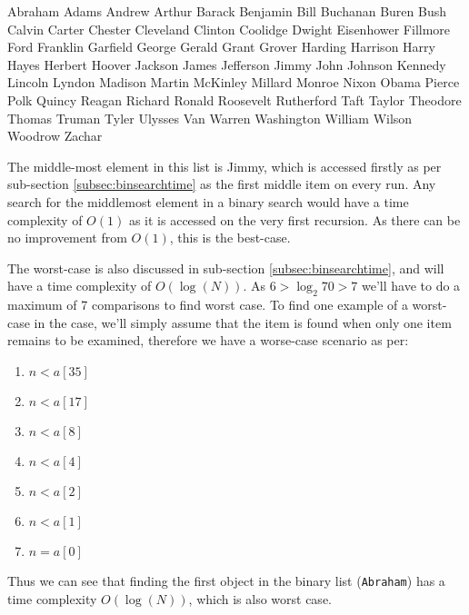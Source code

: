 \documentclass[a4paper,11pt]{article}
\begin{document}
\begin{tiny}
Abraham Adams Andrew Arthur Barack Benjamin Bill Buchanan Buren Bush Calvin Carter Chester Cleveland Clinton Coolidge Dwight Eisenhower Fillmore Ford Franklin Garfield George Gerald Grant Grover Harding Harrison Harry Hayes Herbert Hoover Jackson James Jefferson Jimmy John Johnson Kennedy Lincoln Lyndon Madison Martin McKinley Millard Monroe Nixon Obama Pierce Polk Quincy Reagan Richard Ronald Roosevelt Rutherford Taft Taylor Theodore Thomas Truman Tyler Ulysses Van Warren Washington William Wilson Woodrow Zachar
\end{tiny}

The middle-most element in this list is Jimmy, which is accessed firstly as per sub-section \ref{subsec:binsearchtime} as the first middle item on every run. Any search for the middlemost element in a binary search would have a time complexity of $O(1)$ as it is accessed on the very first recursion. As there can be no improvement from $O(1)$, this is the best-case.

The worst-case is also discussed in sub-section \ref{subsec:binsearchtime}, and will have a time complexity of $O(\log(N))$. As $6 > \log_{2}{70} > 7$ we'll have to do a maximum of 7 comparisons to find worst case. To find one example of a worst-case in the case, we'll simply assume that the item is found when only one item remains to be examined, therefore we have a worse-case scenario as per:

\begin{enumerate}
\item $n < a[35]$
\item $n < a[17]$
\item $n < a[8]$
\item $n < a[4]$
\item $n < a[2]$
\item $n < a[1]$
\item $n = a[0]$
\end{enumerate}

Thus we can see that finding the first object in the binary list (\texttt{Abraham}) has a time complexity $O(\log(N))$, which is also worst case.
\end{document}
